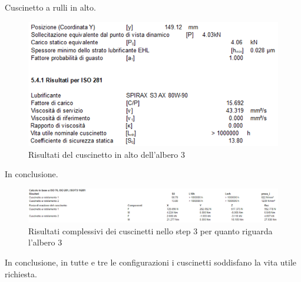 Cuscinetto a rulli in alto.
\begin{figure}[h]
    \centering
    \includegraphics[scale=0.6]{Immagini/RisultatiCuscinettoAlto3Albero3.png}
    \caption{Risultati del cuscinetto in alto dell'albero 3}
    \label{fig:RisultatiCuscinettoAlto3Albero3}
\end{figure}

In conclusione.
\begin{figure}[h]
    \centering
    \includegraphics[scale=0.55]{Immagini/RisultatiCuscinetti3Albero3.png}
    \caption{Risultati complessivi dei cuscinetti nello step 3 per quanto riguarda l'albero 3}
    \label{fig:RisultatiCuscinetti3Albero3}
\end{figure}

In conclusione, in tutte e tre le configurazioni i cuscinetti soddisfano la vita utile richiesta. 
